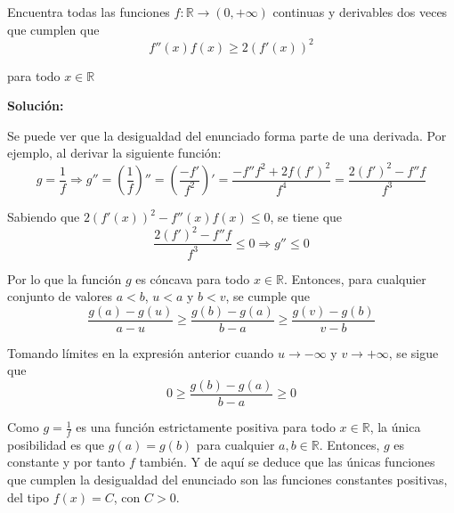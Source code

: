 \documentclass[../../main.tex]{subfiles}
\begin{document}
  \begin{shaded}
    Encuentra todas las funciones $f: \mathbb{R} \to (0, + \infty)$ continuas y derivables dos veces que cumplen que
    $$
    f''(x) f(x) \geqslant 2 (f'(x))^2
    $$

    para todo $x \in \mathbb{R}$
  \end{shaded}

  \textbf{Solución:}

  Se puede ver que la desigualdad del enunciado forma parte de una derivada. Por ejemplo, al derivar la siguiente función:
  $$
  g = \frac{1}{f} \Longrightarrow g'' = \left(\frac{1}{f}\right)'' = \left(\frac{-f'}{f^2}\right)' = \frac{-f'' f^2 + 2 f (f')^2}{f^4} = \frac{2 (f')^2 -f'' f}{f^3}
  $$

  Sabiendo que $ 2 (f'(x))^2 - f''(x) f(x) \leqslant 0$, se tiene que
  $$
  \frac{2 (f')^2 -f'' f}{f^3} \leqslant 0 \Longrightarrow g'' \leqslant 0
  $$

  Por lo que la función $g$ es cóncava para todo $x \in \mathbb{R}$. Entonces, para cualquier conjunto de valores $a < b$, $u < a$ y $b < v$, se cumple que
  $$
  \frac{g(a) - g(u)}{a - u} \geqslant \frac{g(b) - g(a)}{b - a} \geqslant \frac{g(v) - g(b)}{v - b}
  $$

  Tomando límites en la expresión anterior cuando $u \to - \infty$ y $v \to + \infty$, se sigue que
  $$
  0 \geqslant \frac{g(b) - g(a)}{b - a} \geqslant 0
  $$

  Como $g = \displaystyle\frac{1}{f}$ es una función estrictamente positiva para todo $x \in \mathbb{R}$, la única posibilidad es que $g(a) = g(b)$ para cualquier $a, b \in \mathbb{R}$. Entonces, $g$ es constante y por tanto $f$ también. Y de aquí se deduce que las únicas funciones que cumplen la desigualdad del enunciado son las funciones constantes positivas, del tipo $f(x) = C$, con $C > 0$.
\end{document}
